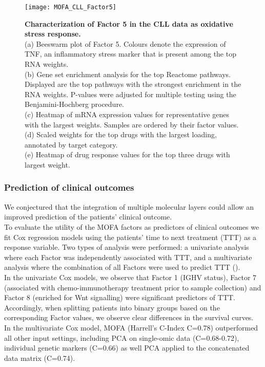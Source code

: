 \begin{figure}[H]
	\centering 	
	\texttt{[image: MOFA\_CLL\_Factor5]}
	\caption{
	\textbf{Characterization of Factor 5 in the CLL data as oxidative stress response.}\\
	(a) Beeswarm plot of Factor 5. Colours denote the expression of TNF, an inflammatory stress marker that is present among the top RNA weights.\\
	(b) Gene set enrichment analysis for the top Reactome pathways. Displayed are the top pathways with the strongest enrichment in the RNA weights. P-values were adjusted for multiple testing using the Benjamini-Hochberg procedure.\\
	(c) Heatmap of mRNA expression values for representative genes with the largest weights. Samples are ordered by their factor values.\\
	(d) Scaled weights for the top drugs with the largest loading, annotated by target category.\\
	(e) Heatmap of drug response values for the top three drugs with largest weight.
	}
	\label{fig:MOFA_CLL_Factor5}
\end{figure}


\subsubsection{Prediction of clinical outcomes}

We conjectured that the integration of multiple molecular layers could allow an improved prediction of the patients' clinical outcome.\\
To evaluate the utility of the MOFA factors as predictors of clinical outcomes we fit Cox regression models \cite{Cox1972} using the patients' time to next treatment (TTT) as a response variable. Two types of analysis were performed: a univariate analysis where each Factor was independently associated with TTT, and a multivariate analysis where the combination of all Factors were used to predict TTT ().\\
In the univariate Cox models, we observe  that Factor 1 (IGHV status), Factor 7 (associated with chemo-immunotherapy treatment prior to sample collection) and Factor 8 (enriched for Wnt signalling) were significant predictors of TTT. Accordingly, when splitting patients into binary groups based on the corresponding Factor values, we observe clear differences in the survival curves.\\
In the multivariate Cox model, MOFA (Harrell's C-Index C=0.78) outperformed all other input settings, including PCA on single-omic data (C=0.68-0.72), individual genetic markers (C=0.66) as well PCA applied to the concatenated data matrix (C=0.74).

